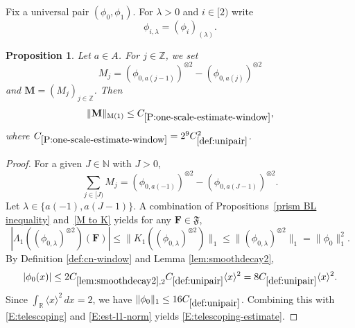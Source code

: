 \documentclass[12pt,reqno]{amsart}
\theoremstyle{plain}
\newtheorem{proposition}[theorem]{Proposition}
\numberwithin{equation}{section}
\theoremstyle{remark}
\newcommand{\uses}[1]{}
\newcommand{\usesdefs}[1]{}
\newcommand{\Z}{{\mathbb Z}}
\newcommand{\R}{{\mathbb R}}
\begin{document}
Fix a universal pair $(\phi_0,\phi_1)$. For $\lambda>0$ and $i\in[2)$ write
\begin{equation}\label{auto:rescaled-window-continuous-notation} \phi_{i,\lambda} = (\phi_i)_{(\lambda)}. \end{equation}

\begin{proposition}\label{P:one-scale-estimate-window}\uses{prism BL inequality,M to K,lem:smoothdecay2}\usesdefs{bracket bump,normalized function tuples,auto:prism-form-definition,multiplicatively spaced monotone sequences,kernel sequences,def:cn-window,def:unipair}
Let $a\in A$. For $j\in \Z$, we set
\begin{equation}\label{auto:one-scale-window-kernel}
M_j=(\phi_{0,a(j-1)})^{\otimes 2} - (\phi_{0,a(j)})^{\otimes 2}
\end{equation}
and $\mathbf{M}=(M_j)_{j\in \Z}$. Then
\begin{equation}\label{E:telescoping-estimate}
\|\mathbf{M}\|_{\rm M(1)} \leq C_{\ref{P:one-scale-estimate-window}},
\end{equation}
where $C_{\ref{P:one-scale-estimate-window}}=2^9C_{\ref{def:unipair}}^2$.


\end{proposition}

\begin{proof}
For a given $J\in \mathbb N$ with $J>0$,
\begin{equation}\label{E:telescoping}
\sum_{j\in [J)} M_j=(\phi_{0,a(-1)})^{\otimes 2}-(\phi_{0,a(J-1)})^{\otimes 2}.
\end{equation}
Let $\lambda \in \{a(-1), a(J-1)\}$.
A combination of Propositions~\ref{prism BL inequality} and~\ref{M to K} yields for any $\mathbf{F} \in \mathfrak{F}$,
\begin{equation}\label{E:est-l1-norm}
|\Lambda_1 ((\phi_{0,\lambda})^{\otimes 2})(\mathbf{F})| \leq
\|K_1((\phi_{0,\lambda})^{\otimes 2})\|_1 \leq\|(\phi_{0,\lambda})^{\otimes 2}\|_1
=\|\phi_0\|_1^2.
\end{equation}
By Definition \ref{def:cn-window} and Lemma \ref{lem:smoothdecay2},
\begin{equation}\label{E:est-of-l1-norm}
|\phi_0(x)|
\le 2C_{\ref{lem:smoothdecay2},2}C_{\ref{def:unipair}}\langle x\rangle^2
=8C_{\ref{def:unipair}}\langle x\rangle^2.
\end{equation}
Since $\int_\R\langle x\rangle^2\,dx=2$, we have $\|\phi_0\|_1\le16C_{\ref{def:unipair}}$. Combining this with \eqref{E:telescoping} and \eqref{E:est-l1-norm} yields \eqref{E:telescoping-estimate}.
\end{proof}
\end{document}
